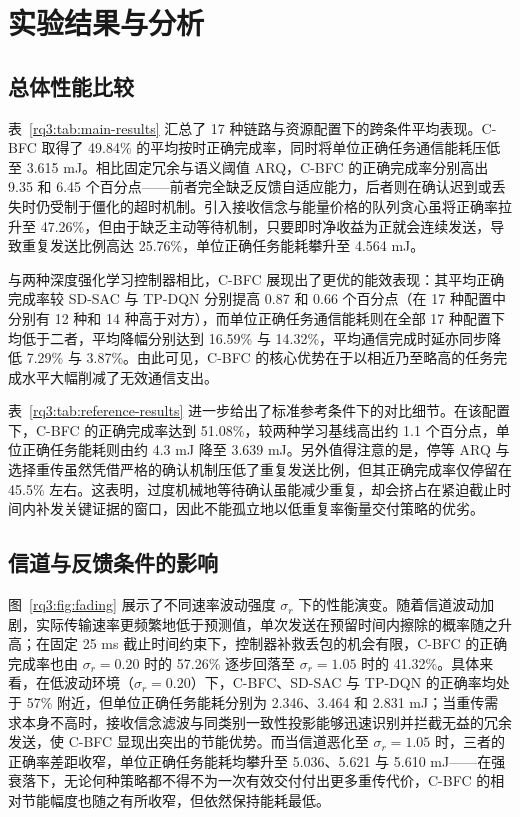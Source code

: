 \section{实验结果与分析}

\subsection{总体性能比较}
\label{rq3:subsec:overall-results}

表~\ref{rq3:tab:main-results} 汇总了 17 种链路与资源配置下的跨条件平均表现。C-BFC 取得了 49.84\% 的平均按时正确完成率，同时将单位正确任务通信能耗压低至 3.615 mJ。相比固定冗余与语义阈值 ARQ，C-BFC 的正确完成率分别高出 9.35 和 6.45 个百分点——前者完全缺乏反馈自适应能力，后者则在确认迟到或丢失时仍受制于僵化的超时机制。引入接收信念与能量价格的队列贪心虽将正确率拉升至 47.26\%，但由于缺乏主动等待机制，只要即时净收益为正就会连续发送，导致重复发送比例高达 25.76\%，单位正确任务能耗攀升至 4.564 mJ。



与两种深度强化学习控制器相比，C-BFC 展现出了更优的能效表现：其平均正确完成率较 SD-SAC 与 TP-DQN 分别提高 0.87 和 0.66 个百分点（在 17 种配置中分别有 12 种和 14 种高于对方），而单位正确任务通信能耗则在全部 17 种配置下均低于二者，平均降幅分别达到 16.59\% 与 14.32\%，平均通信完成时延亦同步降低 7.29\% 与 3.87\%。由此可见，C-BFC 的核心优势在于以相近乃至略高的任务完成水平大幅削减了无效通信支出。



表~\ref{rq3:tab:reference-results} 进一步给出了标准参考条件下的对比细节。在该配置下，C-BFC 的正确完成率达到 51.08\%，较两种学习基线高出约 1.1 个百分点，单位正确任务能耗则由约 4.3 mJ 降至 3.639 mJ。另外值得注意的是，停等 ARQ 与选择重传虽然凭借严格的确认机制压低了重复发送比例，但其正确完成率仅停留在 45.5\% 左右。这表明，过度机械地等待确认虽能减少重复，却会挤占在紧迫截止时间内补发关键证据的窗口，因此不能孤立地以低重复率衡量交付策略的优劣。

\FloatBarrier
\subsection{信道与反馈条件的影响}
\label{rq3:subsec:fading-results}
\label{rq3:subsec:feedback-results}

图~\ref{rq3:fig:fading} 展示了不同速率波动强度 $\sigma_r$ 下的性能演变。随着信道波动加剧，实际传输速率更频繁地低于预测值，单次发送在预留时间内擦除的概率随之升高；在固定 25 ms 截止时间约束下，控制器补救丢包的机会有限，C-BFC 的正确完成率也由 $\sigma_r=0.20$ 时的 57.26\% 逐步回落至 $\sigma_r=1.05$ 时的 41.32\%。具体来看，在低波动环境（$\sigma_r=0.20$）下，C-BFC、SD-SAC 与 TP-DQN 的正确率均处于 57\% 附近，但单位正确任务能耗分别为 2.346、3.464 和 2.831 mJ；当重传需求本身不高时，接收信念滤波与同类别一致性投影能够迅速识别并拦截无益的冗余发送，使 C-BFC 显现出突出的节能优势。而当信道恶化至 $\sigma_r=1.05$ 时，三者的正确率差距收窄，单位正确任务能耗均攀升至 5.036、5.621 与 5.610 mJ——在强衰落下，无论何种策略都不得不为一次有效交付付出更多重传代价，C-BFC 的相对节能幅度也随之有所收窄，但依然保持能耗最低。

